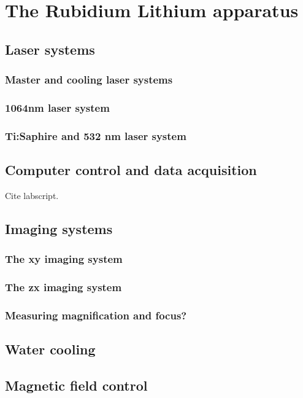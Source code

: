 


\renewcommand{\thechapter}{3}


\chapter{The Rubidium Lithium apparatus}

\section{Laser systems}
\subsection{Master and cooling laser systems}
\subsection{1064nm laser system}
\subsection{Ti:Saphire and 532 nm laser system}
\section{Computer control and data acquisition}
Cite labscript. 
\section{Imaging systems}
\subsection{The xy imaging system}
\subsection{The zx imaging system}
\subsection{Measuring magnification and focus?}

\section{Water cooling}

\section{Magnetic field control}

